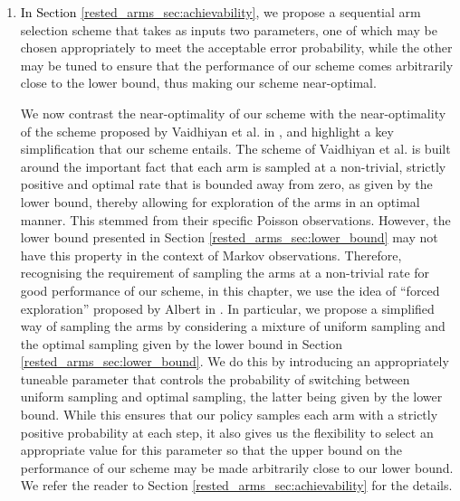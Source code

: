 \begin{enumerate}
    \item \textcolor{black}{In Section \ref{rested_arms_sec:achievability}}, we propose a sequential arm selection scheme that takes as inputs two parameters, one of which may be chosen appropriately to meet the acceptable error probability, while the other may be tuned to ensure that the performance of our scheme comes arbitrarily close to the lower bound, thus making our scheme near-optimal.


    We now contrast the near-optimality of our scheme with the near-optimality of the scheme proposed by Vaidhiyan et al. in \cite{vaidhiyan2017learning}, and highlight a key simplification that our scheme entails. The scheme of Vaidhiyan et al. is built around the important fact that each arm is sampled at a non-trivial, strictly positive and optimal rate that is bounded away from zero, as given by the lower bound, thereby allowing for exploration of the arms in an optimal manner. This stemmed from their specific Poisson observations. However, the lower bound presented in Section \ref{rested_arms_sec:lower_bound} may not have this property
in the context of Markov observations.
    Therefore, recognising the requirement of sampling the arms at a non-trivial rate for good performance of our scheme, in this chapter, we use the idea of ``forced exploration'' proposed by Albert in \cite{albert1961sequential}. In particular, we propose a simplified way of sampling the arms by considering a mixture of uniform sampling and the optimal sampling given by the lower bound in Section \ref{rested_arms_sec:lower_bound}. We do this by introducing an appropriately tuneable parameter that controls the probability of switching between uniform sampling and optimal sampling, the latter being given by the lower bound. While this ensures that our policy samples each arm with a strictly positive probability at each step, it also gives us the flexibility to select an appropriate value for this parameter so that the upper bound on the performance of our scheme may be made arbitrarily close to our lower bound. We refer the reader to Section \ref{rested_arms_sec:achievability} for the details.
\end{enumerate}

